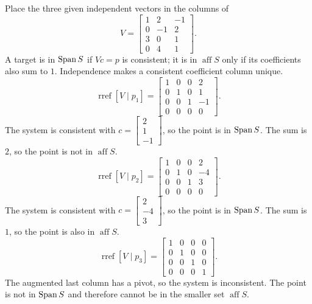 Place the three given independent vectors in the columns of
\[V=\begin{bmatrix}1&2&-1\\0&-1&2\\3&0&1\\0&4&1\end{bmatrix}.\]
A target is in $\operatorname{Span} S$ if $Vc=p$ is consistent; it is in $\operatorname{aff}S$ only if its coefficients also sum to $1$. Independence makes a consistent coefficient column unique.
\[\operatorname{rref}[V\mid p_{1}]=\begin{bmatrix}1&0&0&2\\0&1&0&1\\0&0&1&-1\\0&0&0&0\end{bmatrix}.\]
The system is consistent with $c=\begin{bmatrix}2\\1\\-1\end{bmatrix}$, so the point is in $\operatorname{Span} S$. The sum is $2$, so the point is not in $\operatorname{aff}S$.
\[\operatorname{rref}[V\mid p_{2}]=\begin{bmatrix}1&0&0&2\\0&1&0&-4\\0&0&1&3\\0&0&0&0\end{bmatrix}.\]
The system is consistent with $c=\begin{bmatrix}2\\-4\\3\end{bmatrix}$, so the point is in $\operatorname{Span} S$. The sum is $1$, so the point is also in $\operatorname{aff}S$.
\[\operatorname{rref}[V\mid p_{3}]=\begin{bmatrix}1&0&0&0\\0&1&0&0\\0&0&1&0\\0&0&0&1\end{bmatrix}.\]
The augmented last column has a pivot, so the system is inconsistent. The point is not in $\operatorname{Span} S$ and therefore cannot be in the smaller set $\operatorname{aff}S$.


